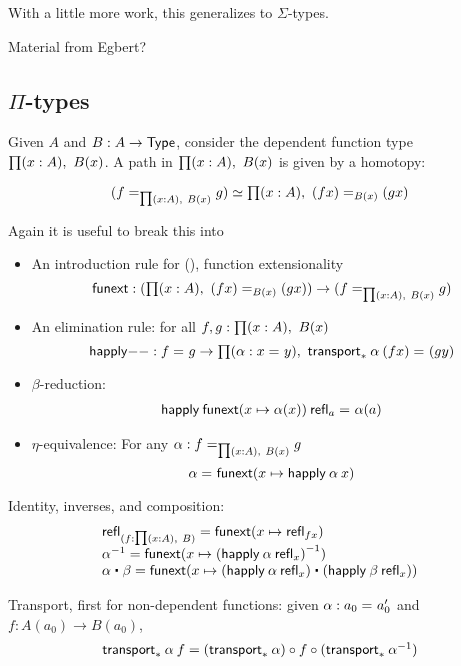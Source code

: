 With a little more work, this generalizes to $\Sigma$-types. 

Material from Egbert?

\subsection{$\Pi$-types}

Given $A$ and $B : A \to \mathsf{Type}$, consider the dependent function type $\prd{x:A}B(x)$.
A path in $\prd{x:A} B(x)$ is given by a homotopy:  

\[
\eqv{(\id[\prd{x:A} B(x)]{f}{g})}{\prd{x:A} \id[B(x)]{(f x)}{(g x)}}
\]

Again it is useful to break this into 

\begin{itemize}
\item An introduction rule for {()}, function extensionality
  \[
  \funext : (\prd{x:A} \id[B(x)]{(f x)}{(g x)}) \to {(\id[\prd{x:A} B(x)]{f}{g})}
  \]
\item An elimination rule: for all $f,g : \prd{x:A} B(x)$
  \[
  \happly{-}{-} : \id{f}{g} \to \prd{\alpha : \id{x}{y}} \id{\transport{B}{\alpha} \: {(f x)}}{(g y)}
  \]
\item $\beta$-reduction: 
  \[
  \begin{array}{l}
  \mathsf{happly} \: {\mathsf{funext}{(x \mapsto \alpha(x))}} \: {\mathsf{refl}_{a}} =_{} \alpha(a)
  \end{array}
  \]
\item $\eta$-equivalence: For any $\alpha : \id[\prd{x:A} B(x)] f g$
  \[
  \alpha =_{} \mathsf{funext} (x \mapsto \mathsf{happly} \: \alpha \: x)
  \]
\end{itemize}


Identity, inverses, and composition:
\[
\begin{array}{l}
\refl{(f : \prd{x:A} B)} = \funext(x \mapsto \refl{f x}) \\
\opp{\alpha} = \funext (x \mapsto \opp{(\happly \: {\alpha} \: {\refl x})})  \\
{\alpha} \ct \beta = \funext (x \mapsto {(\happly \: {\alpha} \: {\refl x}) \ct (\happly \: {\beta} \: {\refl x})})  \\
\end{array}
\]

\newcommand{\fcomp}{\circ}

Transport, first for non-dependent functions: given $\alpha : a_0 =_{} a_0'$
and $f : A(a_0) \to B(a_0)$, 
\[
\begin{array}{l}
\transport{x_0:A_0 \mapsto A(x_0) \to B(x_0)}{\alpha} \: f = 
   (\transport{x_0:A_0 \mapsto B(x_0)}{\alpha}) \fcomp f \fcomp (\transport{x:A_0 \mapsto A(x_0)}{\opp \alpha})
\end{array}
\]

